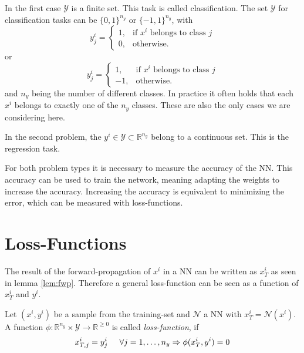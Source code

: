 \documentclass[a4paper, 12pt]{scrreprt} %
\begin{document}
In the first case $\mathcal{Y}$ is a finite set. This task is called classification. The set $\mathcal{Y}$ for classification tasks can be $\{0,1\}^{n_y}$ or $\{-1,1\}^{n_y}$, with 
\begin{equation*}
y_j^i = \begin{cases} 1, & \text{if $x^i$ belongs to class $j$} \\
0, & \text{otherwise.}
\end{cases}
\end{equation*}
or
\begin{equation*}
y_j^i = \begin{cases} 1, & \text{if $x^i$ belongs to class $j$} \\
-1, & \text{otherwise.}
\end{cases}
\end{equation*}
and $n_y$ being the number of different classes. In practice it often holds that each $x^i$ belongs to exactly one of the $n_y$ classes. These are also the only cases we are considering here.

In the second problem, the $y^i \in \mathcal{Y} \subset \mathbb R^{n_y}$ belong to a continuous set. This is the regression task.

For both problem types it is necessary to measure the accuracy of the \ac{NN}. This accuracy can be used to train the network, meaning adapting the weights to increase the accuracy. Increasing the accuracy is equivalent to minimizing the error, which can be measured with loss-functions.


\section{Loss-Functions}
\label{sec:losfunc}

The result of the forward-propagation of $x^i$ in a \ac{NN} can be written as $x^i_T$ as seen in lemma \ref{lem:fwp}. Therefore a general loss-function can be seen as a function of $x^i_T$ and $y^i$. 

\begin{definition}
Let $(x^i,y^i)$ be a sample from the training-set and $\mathcal{N}$ a \ac{NN} with $x^i_T = \mathcal{N}(x^i)$. A function $\phi : \mathbb{R}^{n_y} \times \mathcal{Y} \to \mathbb{R}^{\geq 0}$ is called \emph{loss-function}, if 
\begin{equation*}
x^i_{T,j} = y^i_j \hspace{0.5cm} \forall j=1,\dots, n_y \Rightarrow  \phi(x^i_T,y^i) = 0 
\end{equation*}
\end{definition}
\end{document}
